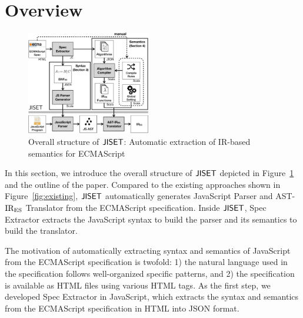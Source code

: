 \section{Overview}
\begin{figure}
  \centering
  \includegraphics[width=0.48\textwidth]{img/overview.png}
  \caption{Overall structure of \( \text{\sf JISET} \): Automatic extraction of
IR-based semantics for ECMAScript}
  \label{fig:overview}
\vspace*{-1em}
\end{figure}

In this section, we introduce the overall structure of \( \text{\sf JISET} \)
depicted in Figure~\ref{fig:overview} and the outline of the paper.
Compared to the existing approaches shown in
Figure~\ref{fig:existing}, \( \text{\sf JISET} \) automatically generates
{\sf JavaScript Parser} and {\sf AST-\( \text{IR}_\text{ES} \) Translator} from the
ECMAScript specification.  Inside \( \text{\sf JISET} \), {\sf Spec Extractor}
extracts the JavaScript syntax to build the parser and its semantics
to build the translator.

The motivation of automatically extracting syntax and semantics
of JavaScript from the ECMAScript specification is twofold: 1) the
natural language used in the specification follows well-organized
specific patterns, and 2) the specification is available as HTML files
using various HTML tags.  As the first step, we developed {\sf Spec Extractor}
in JavaScript, which extracts the syntax and semantics from the
ECMAScript specification in HTML into JSON format.

